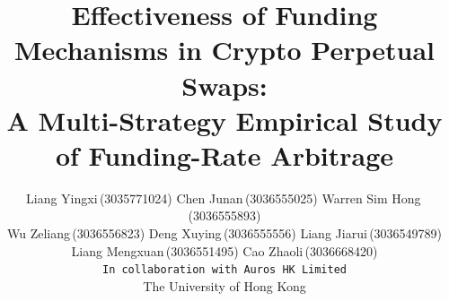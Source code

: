 \documentclass[10pt,twocolumn,a4paper]{article}
\begin{document}
\title{\textbf{Effectiveness of Funding Mechanisms in Crypto Perpetual
       Swaps:\\ A Multi-Strategy Empirical Study of Funding-Rate Arbitrage}}

\author{Liang Yingxi\,(3035771024) \quad Chen Junan\,(3036555025) \quad
        Warren Sim Hong\,(3036555893) \\[2pt]
        Wu Zeliang\,(3036556823) \quad Deng Xuying\,(3036555556) \quad
        Liang Jiarui\,(3036549789) \\[2pt]
        Liang Mengxuan\,(3036551495) \quad Cao Zhaoli\,(3036668420) \\[3pt]
        {\tt\small In collaboration with Auros HK Limited}\\[2pt]
        The University of Hong Kong}

\date{}
\end{document}
